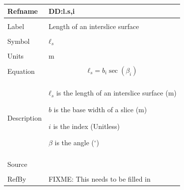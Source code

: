 \documentclass[12pt]{article}
\begin{document}
\noindent \begin{minipage}{\textwidth}
\begin{tabular}{p{} p{}}
\toprule \textbf{Refname} & \textbf{DD:l.s,i}
\label{DD:l.s,i}
\\ \midrule \\
Label & Length of an interslice surface
\\ \midrule \\
Symbol & ${ℓ_{s}}$
\\ \midrule \\
Units & m
\\ \midrule \\
Equation & \begin{dmath}
           {ℓ_{s}}=b_{i} \sec\left(β_{i}\right)
           \end{dmath}
\\ \midrule \\
Description & \begin{symbDescription}
              \item{${ℓ_{s}}$ is the length of an interslice surface (m)}
              \item{$b$ is the base width of a slice (m)}
              \item{$i$ is the index (Unitless)}
              \item{$β$ is the angle (${}^{\circ}$)}
              \end{symbDescription}
\\ \midrule \\
Source &
\\ \midrule \\
RefBy & FIXME: This needs to be filled in
\\ \bottomrule \end{tabular}
\end{minipage}\\
~\newline
\end{document}
